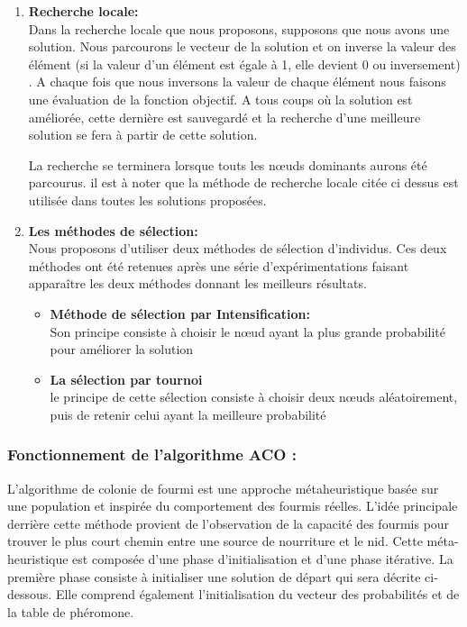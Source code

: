 \begin{enumerate}[label=\alph*)]
	\item \textbf{Recherche locale:}\\
	Dans la recherche locale que nous proposons, supposons que nous avons une solution. Nous parcourons le vecteur de la solution et on inverse la valeur des élément (si la valeur d’un élément est égale à 1, elle devient 0 ou inversement) . A chaque fois que nous inversons  la valeur  de chaque élément nous faisons une évaluation de la fonction objectif. A tous coups où la solution est améliorée, cette dernière est sauvegardé et la recherche d’une meilleure solution se fera à partir de cette solution.
	
La recherche se terminera lorsque touts  les nœuds dominants aurons été parcourus.
il est à noter que la méthode de recherche locale citée ci dessus est utilisée dans toutes les solutions proposées.
	
	\item \textbf{Les méthodes de sélection:}\\
	Nous proposons d'utiliser deux méthodes de sélection d’individus. Ces deux méthodes ont été retenues après une série d'expérimentations faisant apparaître les deux méthodes donnant les meilleurs résultats.

	\begin{itemize}
		\item \textbf{Méthode de sélection par Intensification: }\\
		Son principe consiste à choisir le nœud ayant la plus grande probabilité pour améliorer la solution 
		
		\item \textbf{La sélection par tournoi}\\
		le principe de cette sélection consiste à choisir deux nœuds aléatoirement, puis de retenir celui ayant la meilleure probabilité 
	\end{itemize}


\end{enumerate}


\subsubsection{Fonctionnement de l’algorithme ACO :}
L’algorithme de colonie de fourmi est une approche métaheuristique basée sur une  population et inspirée du comportement des fourmis réelles. L’idée principale derrière cette méthode provient de l’observation de la capacité des fourmis pour trouver le plus court chemin entre une  source de nourriture et le nid.
Cette méta-heuristique est composée d’une phase d’initialisation et d’une phase itérative. La première phase consiste à initialiser une solution de départ qui sera décrite ci-dessous. Elle comprend également l’initialisation du vecteur des probabilités et de la table de phéromone.

